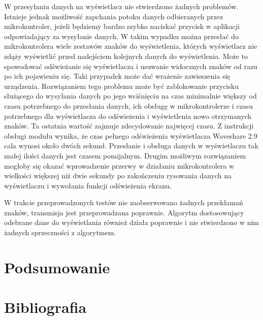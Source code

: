 \documentclass[a4paper,12pt, twoside]{article}
\begin{document}
    	W przesyłaniu danych na wyświetlacz nie stwierdzono żadnych problemów. Istnieje jednak możliwość zapchania potoku danych odbieranych przez mikrokontroler, jeżeli będziemy bardzo szybko naciskać przycisk w aplikacji odpowiadający za wysyłanie danych. W takim wypadku można przesłać do mikrokontrolera wiele zestawów znaków do wyświetlenia, których wyświetlacz nie zdąży wyświetlić przed nadejściem kolejnych danych do wyświetlenia. Może to spowodować odświeżanie się wyświetlacza i usuwanie widocznych znaków od razu po ich pojawieniu się. Taki przypadek może dać wrażenie zawieszenia się urządzenia. Rozwiązaniem tego problemu może być zablokowanie przycisku służącego do wysyłania danych po jego wciśnięciu na czas minimalnie większy od czasu potrzebnego do przesłania danych, ich obsługę w mikrokontrolerze i czasu potrzebnego dla wyświetlacza do odświeżenia i wyświetlenia nowo otrzymanych znaków. Ta ostatnia wartość zajmuje zdecydowanie najwięcej czasu. Z instrukcji obsługi modułu wynika, że czas pełnego odświeżenia wyświetlacza Waveshare 2.9 cala wynosi około dwóch sekund\cite{waveshare}. Przesłanie i obsługa danych w wyświetlaczu tak małej ilości danych jest czasem pomijalnym. Drugim możliwym rozwiązaniem mogłoby się okazać wprowadzenie przerwy w działaniu mikrokontrolera w wielkości większej niż dwie sekundy po zakończeniu rysowania danych na wyświetlaczu i wywołania funkcji odświeżenia ekranu. 
    	
    	
    	
    	
    	
    	W trakcie przeprowadzonych testów nie zaobserwowano żadnych przekłamań znaków, transmisja jest przeprowadzana poprawnie. Algorytm dostosowujący odebrane dane do wyświetlania również działa poprawnie i nie stwierdzono w nim żadnych sprzeczności z algorytmem.
    	
    	
    	
    	
    	
    	
    	
    	\section{Podsumowanie}
    	
    	
    	\newpage
    	\section{Bibliografia}
    	
\end{document}
